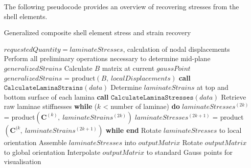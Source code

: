 The following pseudocode provides an overview of recovering stresses from the shell elements.

\begin{algorithm}
	\onehalfspacing
	\caption{Generalized composite shell element stress and strain recovery}
	\label{general composite shell stress pseudocode}
	\begin{algorithmic}[1]
		\Require $requestedQuantity = laminateStresses$, calculation of nodal displacements
		\State Perform all preliminary operations necessary to determine mid-plane $generalizedStrains$
		\State Calculate $B$ matrix at current $gaussPoint$
		\State $generalizedStrains$ = product$(B,\ localDisplacements)$
		\State \textbf{call} $\texttt{CalculateLaminaStrains}(data)$
		\State \hspace{\algorithmicindent}Determine $laminateStrains$ at top and bottom surface of each lamina 
		\State \textbf{call} $\texttt{CalculateLaminaStresses}(data)$
		\State \hspace{\algorithmicindent}Retrieve raw laminae stiffnesses
		\State \hspace{\algorithmicindent}\textbf{while} ($k$ < number of laminae) \textbf{do}
		\State \hspace{\algorithmicindent} \hspace{\algorithmicindent}$laminateStresses^{(2k)}$ = product$(\mathbf{C}^{(k)},\ laminateStrains^{(2k)})$
		\State \hspace{\algorithmicindent} \hspace{\algorithmicindent}$laminateStresses^{(2k+1)}$ = product$(\mathbf{C}^{(k},\ laminateStrains^{(2k+1)})$
		\State \hspace{\algorithmicindent}\textbf{while end}
		\State Rotate $laminateStresses$ to local orientation
		\EndIf
		\State Assemble $laminateStresses$ into $outputMatrix$
		\State Rotate $outputMatrix$ to global orientation
		\EndIf
		\State Interpolate $outputMatrix$ to standard Gauss points for visualisation
		\EndWhile
	\end{algorithmic}
\end{algorithm}

